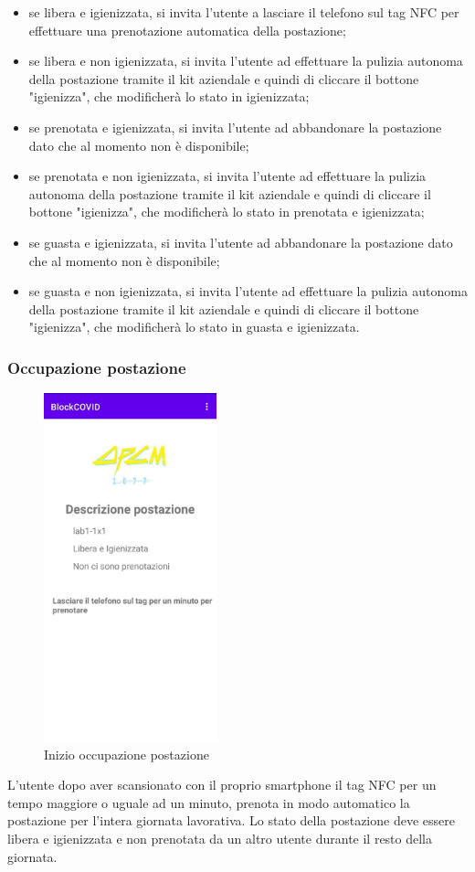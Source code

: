 \begin{itemize}
	\item se libera e igienizzata, si invita l'utente a lasciare il telefono sul tag NFC per effettuare una prenotazione automatica della postazione;
	\item se libera e non igienizzata, si invita l'utente ad effettuare la pulizia autonoma della postazione tramite il kit aziendale e quindi di cliccare il bottone "igienizza", che modificherà lo stato in igienizzata;
	\item se prenotata e igienizzata, si invita l'utente ad abbandonare la postazione dato che al momento non è disponibile;
	\item se prenotata e non igienizzata, si invita l'utente ad effettuare la pulizia autonoma della postazione tramite il kit aziendale e quindi di cliccare il bottone "igienizza", che modificherà lo stato in prenotata e igienizzata;
	\item se guasta e igienizzata, si invita l'utente ad abbandonare la postazione dato che al momento non è disponibile;
	\item se guasta e non igienizzata, si invita l'utente ad effettuare la pulizia autonoma della postazione tramite il kit aziendale e quindi di cliccare il bottone "igienizza", che modificherà lo stato in guasta e igienizzata.
\end{itemize}
 
\subsubsection{Occupazione postazione}
\begin{figure}[H]
	\centering
	\includegraphics[width=5cm]{res/images/DescrizionePostazione1.png}
	\caption{Inizio occupazione postazione}
\end{figure}
L'utente dopo aver scansionato con il proprio smartphone il tag NFC per un tempo maggiore o uguale ad un minuto, prenota in modo automatico la postazione per
l’intera giornata lavorativa. Lo stato della postazione deve essere libera e igienizzata e non prenotata da un altro utente durante il resto della giornata.
